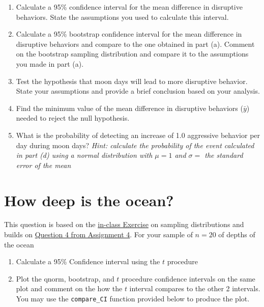 \documentclass[letterpaper,9pt,twoside,printwatermark=false]{pinp}
\providecommand{\tightlist}{%
  \setlength{\itemsep}{0pt}\setlength{\parskip}{0pt}}
\begin{document}
\begin{enumerate}
\def\labelenumi{\alph{enumi}.}
\tightlist
\item
  Calculate a 95\% confidence interval for the mean difference in
  disruptive behaviors. State the assumptions you used to calculate this
  interval.
\item
  Calculate a 95\% bootstrap confidence interval for the mean difference
  in disruptive behaviors and compare to the one obtained in part (a).
  Comment on the bootstrap sampling distribution and compare it to the
  assumptions you made in part (a).
\item
  Test the hypothesis that moon days will lead to more disruptive
  behavior. State your assumptions and provide a brief conclusion based
  on your analysis.
\item
  Find the minimum value of the mean difference in disruptive behaviors
  (\(\bar{y}\)) needed to reject the null hypothesis.
\item
  What is the probability of detecting an increase of 1.0 aggressive
  behavior per day during moon days? \emph{Hint: calculate the
  probability of the event calculated in part (d) using a normal
  distribution with \(\mu=1\) and \(\sigma =\) the standard error of the
  mean}
\end{enumerate}

\newpage 

\section{How deep is the ocean?}\label{how-deep-is-the-ocean}

This question is based on the
\href{https://github.com/sahirbhatnagar/EPIB607/blob/master/exercises/water/students/260194225_water_exercise_epib607.pdf}{in-class
Exercise} on sampling distributions and builds on
\href{https://github.com/sahirbhatnagar/EPIB607/raw/master/assignments/a4/a4_clt_ci.pdf}{Question
4 from Assignment 4}. For your sample of \(n=20\) of depths of the ocean

\begin{enumerate}
\def\labelenumi{\alph{enumi}.}
\tightlist
\item
  Calculate a 95\% Confidence interval using the \(t\) procedure
\item
  Plot the qnorm, bootstrap, and \(t\) procedure confidence intervals on
  the same plot and comment on the how the \(t\) interval compares to
  the other 2 intervals. You may use the \texttt{compare\_CI} function
  provided below to produce the plot.
\end{enumerate}
\end{document}
